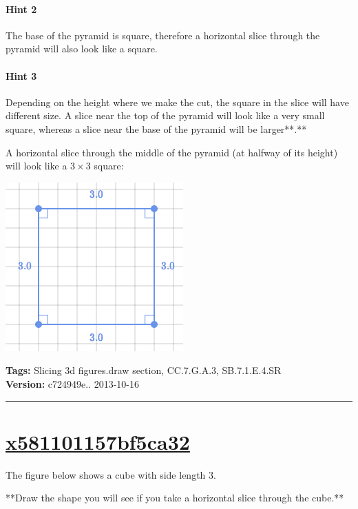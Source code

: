 \documentclass[twocolumn,10pt]{article}
\def\shrinkfactor{0.4}
\begin{document}
\paragraph{Hint 2}The base of the pyramid is square, therefore a horizontal slice through the pyramid will also look like a square.

\paragraph{Hint 3}Depending on the height where we make the cut, the square in the slice will have different size. A slice near the top of the pyramid will look like a very small square, whereas a slice near the base of the pyramid will be larger**.**

A horizontal slice through the middle of the pyramid (at halfway of its height) will look like a $3 \times 3$ square:    

\includegraphics[scale=\shrinkfactor]{figures/339319c697846538f4f62770f5fc3cc189f26e88.png}



\medskip
\noindent
\textbf{Tags:} {\footnotesize Slicing 3d figures.draw section, CC.7.G.A.3, SB.7.1.E.4.SR}\\
\textbf{Version:} c724949e.. 2013-10-16
\smallskip\hrule





\section{\href{https://www.khanacademy.org/devadmin/content/items/x581101157bf5ca32}{x581101157bf5ca32}}

\noindent
The figure below shows a cube with side length $3$.   

**Draw the shape you will see if you take a horizontal slice through the cube.**
\end{document}
